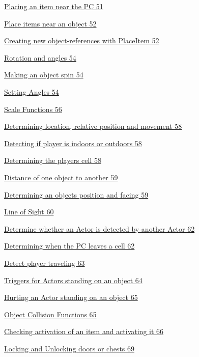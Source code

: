 \documentclass[
]{article}
\begin{document}
\protect\hyperlink{placing-an-item-near-the-pc}{Placing an item near the
PC 51}

\protect\hyperlink{place-items-near-an-object}{Place items near an
object 52}

\protect\hyperlink{creating-new-object-references-with-placeitem}{Creating
new object-references with PlaceItem 52}

\protect\hyperlink{rotation-and-angles}{Rotation and angles 54}

\protect\hyperlink{making-an-object-spin}{Making an object spin 54}

\protect\hyperlink{setting-angles}{Setting Angles 54}

\protect\hyperlink{scale-functions}{Scale Functions 56}

\protect\hyperlink{determining-location-relative-position-and-movement}{Determining
location, relative position and movement 58}

\protect\hyperlink{detecting-if-player-is-indoors-or-outdoors}{Detecting
if player is indoors or outdoors 58}

\protect\hyperlink{determining-the-players-cell}{Determining the players
cell 58}

\protect\hyperlink{distance-of-one-object-to-another}{Distance of one
object to another 59}

\protect\hyperlink{determining-an-objects-position-and-facing}{Determining
an objects position and facing 59}

\protect\hyperlink{line-of-sight}{Line of Sight 60}

\protect\hyperlink{_Toc182634542}{Determine whether an Actor is detected
by another Actor 62}

\protect\hyperlink{determining-when-the-pc-leaves-a-cell}{Determining
when the PC leaves a cell 62}

\protect\hyperlink{detect-player-traveling}{Detect player traveling 63}

\protect\hyperlink{triggers-for-actors-standing-on-an-object}{Triggers
for Actors standing on an object 64}

\protect\hyperlink{hurting-an-actor-standing-on-an-object}{Hurting an
Actor standing on an object 65}

\protect\hyperlink{_Toc182634547}{Object Collision Functions 65}

\protect\hyperlink{checking-activation-of-an-item-and-activating-it}{Checking
activation of an item and activating it 66}

\protect\hyperlink{locking-and-unlocking-doors-or-chests}{Locking and
Unlocking doors or chests 69}
\end{document}
